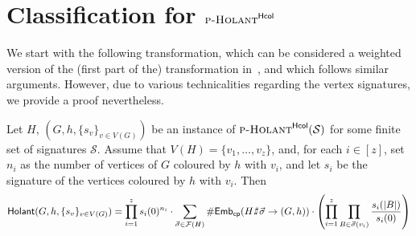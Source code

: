 \documentclass[authorcolumns,numberwithinsect]{no-lipics-v2022}
\def\fracture#1#2{\ensuremath{#1\raisebox{.2ex}{\rotatebox[origin=c]{-15}{$\sharp$}}#2}}
\newcommand{\holantprobstar}{\text{\sc{p-Holant}}^{\mathsf{Hcol}}}
\newcommand{\embscp}{\mathsf{Emb}_{\mathsf{cp}}}
\newcommand{\holant}{\mathsf{Holant}}
\def\fracture#1#2{\ensuremath{#1\raisebox{.2ex}{\rotatebox[origin=c]{-15}{$\sharp$}}#2}}
\begin{document}
\section{Classification for $\holantprobstar$}

We start with the following transformation, which can be considered a weighted version of the (first part of the) transformation in~\cite[Lemma 4.1]{PeyerimhoffRSSVW23}, and which follows similar arguments. However, due to various technicalities regarding the vertex signatures, we provide a proof nevertheless. 

\begin{lemma}\label{lem:holant_star_to_cpembs}
Let $H$, $(G,h,\{s_v\}_{v\in V(G)})$ be an instance of $\holantprobstar(\mathcal{S})$ for some finite set of signatures $\mathcal{S}$. Assume that $V(H)=\{v_1,\dots,v_z\}$, and, for each $i\in [z]$, set $n_i$ as the number of vertices of $G$ coloured by $h$ with $v_i$, and let $s_i$ be the signature of the vertices coloured by $h$ with $v_i$. 
    Then
    \[ \holant(G,h,\{s_v\}_{v\in V(G)}) = \prod_{i=1}^z s_i(0)^{n_i} \cdot \sum_{\vec{\sigma}\in \mathcal{F}(H)} \#\embscp(\fracture{H}{\vec{\sigma}} \to (G,h)) \cdot \left(\prod_{i=1}^z \prod_{B \in \vec{\sigma}(v_i)} \frac{s_i(|B|)}{s_i(0)}  \right) \]
\end{lemma}
\end{document}
